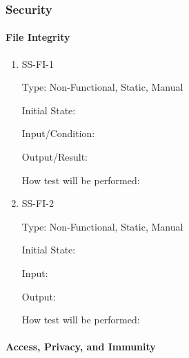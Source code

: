 \documentclass[11pt]{article}
\begin{document}
\subsubsection{Security}

\paragraph{File Integrity}

\begin{enumerate}

\item{SS-FI-1\\}

Type: Non-Functional, Static, Manual
					
Initial State: 
					
Input/Condition: 
					
Output/Result: 
					
How test will be performed: 
					
\item{SS-FI-2\\}

Type: Non-Functional, Static, Manual
					
Initial State: 
					
Input: 
					
Output: 
					
How test will be performed: 

\end{enumerate}

\paragraph{Access, Privacy, and Immunity}
\end{document}
